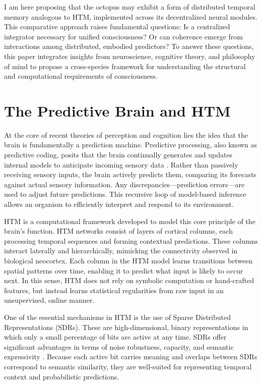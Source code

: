 \documentclass{article}
\begin{document}
I am here proposing that the octopus may exhibit a form of distributed temporal memory analogous to HTM, implemented across its decentralized neural modules. This comparative approach raises fundamental questions: Is a centralized integrator necessary for unified consciousness? Or can coherence emerge from interactions among distributed, embodied predictors? To answer these questions, this paper integrates insights from neuroscience, cognitive theory, and philosophy of mind to propose a cross-species framework for understanding the structural and computational requirements of consciousness.

\section{The Predictive Brain and HTM}

At the core of recent theories of perception and cognition lies the idea that the brain is fundamentally a prediction machine. Predictive processing, also known as predictive coding, posits that the brain continually generates and updates internal models to anticipate incoming sensory data \parencite{clark2016surfing, friston2010free}. Rather than passively receiving sensory inputs, the brain actively predicts them, comparing its forecasts against actual sensory information. Any discrepancies---prediction errors---are used to adjust future predictions. This recursive loop of model-based inference allows an organism to efficiently interpret and respond to its environment.

HTM is a computational framework developed to model this core principle of the brain's function. HTM networks consist of layers of cortical columns, each processing temporal sequences and forming contextual predictions. These columns interact laterally and hierarchically, mimicking the connectivity observed in biological neocortex. Each column in the HTM model learns transitions between spatial patterns over time, enabling it to predict what input is likely to occur next. In this sense, HTM does not rely on symbolic computation or hand-crafted features, but instead learns statistical regularities from raw input in an unsupervised, online manner.

One of the essential mechanisms in HTM is the use of Sparse Distributed Representations (SDRs). These are high-dimensional, binary representations in which only a small percentage of bits are active at any time. SDRs offer significant advantages in terms of noise robustness, capacity, and semantic expressivity \parencite{ahmad2015properties}. Because each active bit carries meaning and overlaps between SDRs correspond to semantic similarity, they are well-suited for representing temporal context and probabilistic predictions.
\end{document}
